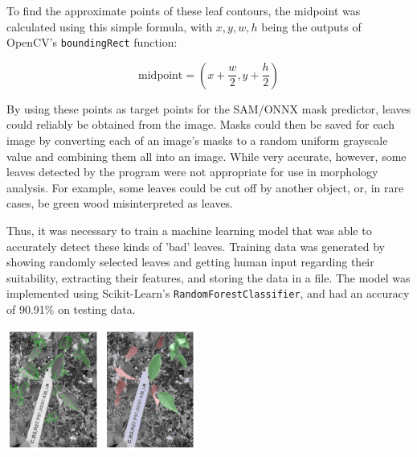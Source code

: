 \documentclass[final,5p,times,twocolumn,authoryear]{elsarticle}
\begin{document}
To find the approximate points of these leaf contours, the midpoint was calculated using this simple formula, with $x, y, w, h$ being the outputs of OpenCV's \verb|boundingRect| function:

\begin{equation}
    \mbox{midpoint} = (x + \frac{w}{2}, y + \frac{h}{2})
\end{equation}

By using these points as target points for the SAM/ONNX mask predictor, leaves could reliably be obtained from the image. Masks could then be saved for each image by converting each of an image's masks to a random uniform grayscale value and combining them all into an image. While very accurate, however, some leaves detected by the program were not appropriate for use in morphology analysis. For example, some leaves could be cut off by another object, or, in rare cases, be green wood misinterpreted as leaves.

Thus, it was necessary to train a machine learning model that was able to accurately detect these kinds of 'bad' leaves. Training data was generated by showing randomly selected leaves and getting human input regarding their suitability, extracting their features, and storing the data in a file. The model was implemented using Scikit-Learn's \verb|RandomForestClassifier|, and had an accuracy of 90.91\% on testing data.

\begin{center}
	\centering
	\includegraphics[width=0.23\textwidth]{images/seg_pipeline/6.png}	
        \includegraphics[width=0.23\textwidth]{images/seg_filter/2_better.png}	
\end{center}
\end{document}

